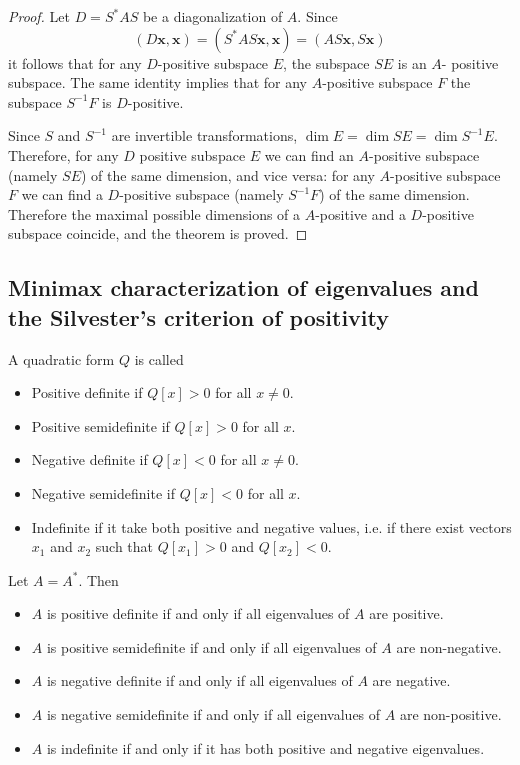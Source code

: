 \begin{proof}
Let $D=S^*AS$ be a diagonalization of $A$. Since
\[(D\bm{x},\bm{x})=(S^*AS\bm{x},\bm{x})=(AS\bm{x},S\bm{x})\]
it follows that for any $D$-positive subspace $E$, the subspace $SE$ is an $A$-
positive subspace. The same identity implies that for any $A$-positive subspace
$F$ the subspace $S^{-1}F$ is $D$-positive.\par
Since $S$ and $S^{-1}$ are invertible transformations, $\dim E=\dim SE=\dim S^{-1}E$. Therefore, for any $D$ positive subspace $E$ we can find an $A$-positive subspace (namely $SE$) of the same dimension, and vice versa: for any $A$-positive subspace $F$ we can find a $D$-positive subspace (namely
$S^{-1}F$) of the same dimension. Therefore the maximal possible dimensions of
a $A$-positive and a $D$-positive subspace coincide, and the theorem is proved.
\end{proof}
\subsection{Minimax characterization of eigenvalues and the Silvester's criterion of positivity}
A quadratic form $Q$ is called
\begin{itemize}
\item Positive definite if $Q[x]>0$ for all $x\neq0$.
\item Positive semidefinite if $Q[x]>0$ for all $x$.
\item Negative definite if $Q[x]<0$ for all $x\neq 0$.
\item Negative semidefinite if $Q[x]<0$ for all $x$.
\item Indefinite if it take both positive and negative values, i.e. if there
exist vectors $x_1$ and $x_2$ such that $Q[x_1]>0$ and $Q[x_2]<0$.
\end{itemize}
\begin{proposition}
Let $A=A^*$. Then
\begin{itemize}
\item $A$ is positive definite if and only if all eigenvalues of $A$ are positive.
\item $A$ is positive semidefinite if and only if all eigenvalues of $A$ are non-negative.
\item $A$ is negative definite if and only if all eigenvalues of $A$ are negative.
\item $A$ is negative semidefinite if and only if all eigenvalues of $A$ are non-positive.
\item $A$ is indefinite if and only if it has both positive and negative eigenvalues.
\end{itemize}
\end{proposition}
